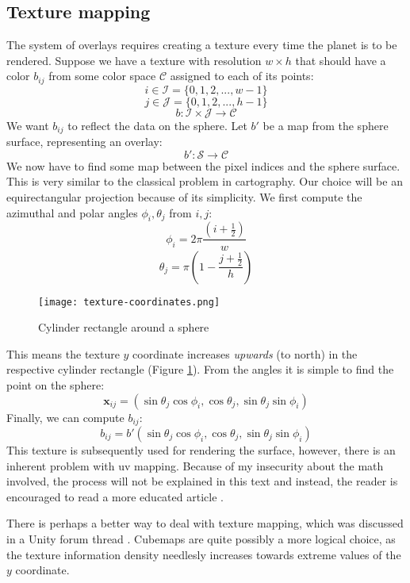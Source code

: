 \subsection{Texture mapping}
The system of overlays requires creating a texture every time the planet is to be rendered. Suppose we have a texture with resolution $w\times h$ that should have a color $b_{ij}$ from some color space $\mathcal{C}$ assigned to each of its points:
$$i\in\mathcal{I}=\{0,1,2,...,w-1\}$$
$$j\in\mathcal{J}=\{0,1,2,...,h-1\}$$
$$b:\mathcal{I}\times\mathcal{J}\rightarrow\mathcal{C}$$
We want $b_{ij}$ to reflect the data on the sphere. Let $b'$ be a map from the sphere surface, representing an overlay:
$$b': \mathcal{S}\rightarrow\mathcal{C}$$
We now have to find some map between the pixel indices and the sphere surface. This is very similar to the classical problem in cartography. Our choice will be an equirectangular projection because of its simplicity. We first compute the azimuthal and polar angles $\phi_i, \theta_j$ from $i,j$:
$$\phi_i = 2\pi\frac{\left(i+\frac{1}{2}\right)}{w}$$
$$\theta_j = \pi(1-\frac{j+\frac{1}{2}}{h})$$
\begin{figure}[ht]
\centering
\texttt{[image: texture-coordinates.png]}
\caption{Cylinder rectangle around a sphere}
\label{fig:rectangle-sphere}
\end{figure}
This means the texture $y$ coordinate increases \textit{upwards} (to north) in the respective cylinder rectangle (Figure \ref{fig:rectangle-sphere}). From the angles it is simple to find the point on the sphere:
$$\mathbf{x}_{ij} = (\sin\theta_j\cos\phi_i,\cos\theta_j,\sin\theta_j\sin\phi_i)$$
Finally, we can compute $b_{ij}$:
$$b_{ij}=b'(\sin\theta_j\cos\phi_i,\cos\theta_j,\sin\theta_j\sin\phi_i)$$
This texture is subsequently used for rendering the surface, however, there is an inherent problem with uv mapping. Because of my insecurity about the math involved, the process will not be explained in this text and instead, the reader is encouraged to read a more educated article \cite{bgolus}.

There is perhaps a better way to deal with texture mapping, which was discussed in a Unity forum thread \cite{unityforum}. Cubemaps are quite possibly a more logical choice, as the texture information density needlesly increases towards extreme values of the $y$ coordinate.
